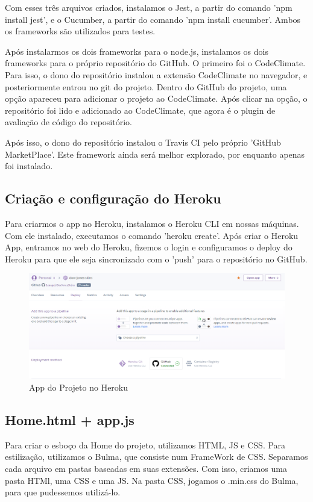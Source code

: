 \documentclass[a4paper,12pt]{article}
\begin{document}
    Com esses três arquivos criados, instalamos o Jest, a partir do comando 'npm install jest', e o Cucumber, a partir
    do comando 'npm install cucumber'. Ambos os frameworks são utilizados para testes.

    Após instalarmos os dois frameworks para o node.js, instalamos os dois frameworks para o próprio repositório do GitHub.
    O primeiro foi o CodeClimate. Para isso, o dono do repositório instalou a extensão CodeClimate no navegador,
    e posteriormente entrou no git do projeto. Dentro do GitHub do projeto, uma opção apareceu para adicionar
    o projeto ao CodeClimate. Após clicar na opção, o repositório foi lido e adicionado ao CodeClimate, 
    que agora é o plugin de avaliação de código do repositório.

    Após isso, o dono do repositório instalou o Travis CI pelo próprio 'GitHub MarketPlace'. Este framework ainda será melhor explorado,
    por enquanto apenas foi instalado.

    \subsection{Criação e configuração do Heroku}
    Para criarmos o app no Heroku, instalamos o Heroku CLI em nossas máquinas. Com ele instalado, executamos o comando
    'heroku create'. Após criar o Heroku App, entramos no web do Heroku, fizemos o login e configuramos o deploy do Heroku
    para que ele seja sincronizado com o 'push' para o repositório no GitHub.\\
    \begin{figure}[!htb]
        \centering
        \includegraphics[scale=0.5]{Imagens/Heroku.png}
        \caption{App do Projeto no Heroku}
    \end{figure}

    \subsection{Home.html + app.js}
    Para criar o esboço da Home do projeto, utilizamos HTML, JS e CSS. Para estilização, utilizamos o Bulma,
    que consiste num FrameWork de CSS. Separamos cada arquivo em pastas baseadas em suas extensões. 
    Com isso, criamos uma pasta HTMl, uma CSS e uma JS. Na pasta CSS, jogamos o .min.css do Bulma, para que 
    pudessemos utilizá-lo.
\end{document}
